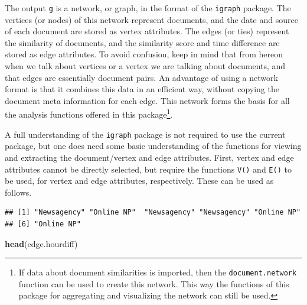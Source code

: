 \documentclass[]{article}
\newenvironment{Shaded}{\begin{snugshade}}{\end{snugshade}}
\newcommand{\KeywordTok}[1]{\textcolor[rgb]{0.13,0.29,0.53}{\textbf{{#1}}}}
\newcommand{\StringTok}[1]{\textcolor[rgb]{0.31,0.60,0.02}{{#1}}}
\newcommand{\NormalTok}[1]{{#1}}
\let\rmarkdownfootnote\footnote%
\def\footnote{\protect\rmarkdownfootnote}
\begin{document}
The output \texttt{g} is a network, or graph, in the format of the
\texttt{igraph} package. The vertices (or nodes) of this network
represent documents, and the date and source of each document are stored
as vertex attributes. The edges (or ties) represent the similarity of
documents, and the similarity score and time difference are stored as
edge attributes. To avoid confusion, keep in mind that from hereon when
we talk about vertices or a vertex we are talking about documents, and
that edges are essentially document pairs. An advantage of using a
network format is that it combines this data in an efficient way,
without copying the document meta information for each edge. This
network forms the basis for all the analysis functions offered in this
package\footnote{If data about document similarities is imported, then
  the \texttt{document.network} function can be used to create this
  network. This way the functions of this package for aggregating and
  visualizing the network can still be used.}.

A full understanding of the \texttt{igraph} package is not required to
use the current package, but one does need some basic understanding of
the functions for viewing and extracting the document/vertex and edge
attributes. First, vertex and edge attributes cannot be directly
selected, but require the functions \texttt{V()} and \texttt{E()} to be
used, for vertex and edge attributes, respectively. These can be used as
follows.

\begin{Shaded}
\end{Shaded}

\begin{verbatim}
## [1] "Newsagency" "Online NP"  "Newsagency" "Newsagency" "Online NP" 
## [6] "Online NP"
\end{verbatim}

\begin{Shaded}
\begin{Highlighting}[]
\KeywordTok{head}\NormalTok{(edge.hourdiff)}
\end{Highlighting}
\end{Shaded}
\end{document}
